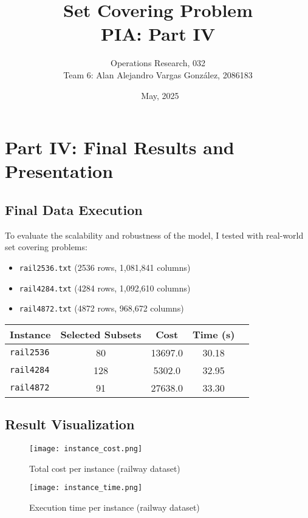 \documentclass[12pt]{article}
\title{Set Covering Problem\\\large PIA: Part IV}
\author{Operations Research, 032\\\large Team 6: Alan Alejandro Vargas González, 2086183}
\date{\ May, 2025}
\begin{document}
\maketitle

\section{Part IV: Final Results and Presentation}

\subsection{Final Data Execution}
To evaluate the scalability and robustness of the model, I tested with real-world set covering problems:

\begin{itemize}
    \item \texttt{rail2536.txt} (2536 rows, 1,081,841 columns)
    \item \texttt{rail4284.txt} (4284 rows, 1,092,610 columns)
    \item \texttt{rail4872.txt} (4872 rows, 968,672 columns)
\end{itemize}

\begin{table}[H]
\centering
\begin{tabular}{|l|c|c|c|c|}
\hline
\textbf{Instance} & \textbf{Selected Subsets} & \textbf{Cost} & \textbf{Time (s)} \\
\hline
\texttt{rail2536} & 80 & 13697.0 & 30.18 \\
\texttt{rail4284} & 128 & 5302.0 & 32.95 \\
\texttt{rail4872} & 91 & 27638.0 & 33.30 \\
\hline
\end{tabular}
\end{table}

\subsection{Result Visualization}

\begin{figure}[H]
    \centering
    \texttt{[image: instance\_cost.png]}
    \caption{Total cost per instance (railway dataset)}
\end{figure}

\begin{figure}[H]
    \centering
    \texttt{[image: instance\_time.png]}
    \caption{Execution time per instance (railway dataset)}
\end{figure}
\end{document}
